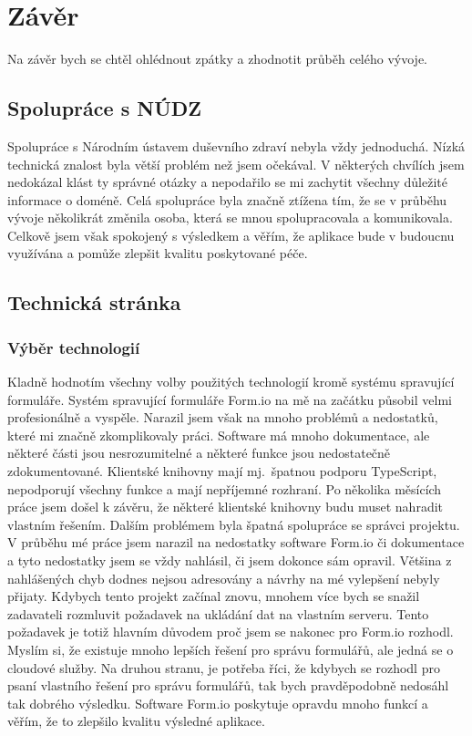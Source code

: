 \chapter*{Závěr}

Na závěr bych se chtěl ohlédnout zpátky a zhodnotit průběh celého vývoje.


\section{Spolupráce s NÚDZ}\label{sec:spoluprace-s-nudz}

Spolupráce s Národním ústavem duševního zdraví nebyla vždy jednoduchá.
Nízká technická znalost byla větší problém než jsem očekával.
V některých chvílích jsem nedokázal klást ty správné otázky a nepodařilo se mi zachytit všechny důležité informace o doméně.
Celá spolupráce byla značně ztížena tím, že se v průběhu vývoje několikrát změnila osoba, která se mnou spolupracovala a komunikovala.
Celkově jsem však spokojený s výsledkem a věřím, že aplikace bude v budoucnu využívána a pomůže zlepšit kvalitu poskytované péče.


\section{Technická stránka}\label{sec:technicka-stranka}

\subsection{Výběr technologií}\label{subsec:vyber-technologii}

Kladně hodnotím všechny volby použitých technologií kromě systému spravující formuláře.
Systém spravující formuláře Form.io na mě na začátku působil velmi profesionálně a vyspěle.
Narazil jsem však na mnoho problémů a nedostatků, které mi značně zkomplikovaly práci.
Software má mnoho dokumentace, ale některé části jsou nesrozumitelné a některé funkce jsou nedostatečně zdokumentované.
Klientské knihovny mají mj.\ špatnou podporu TypeScript, nepodporují všechny funkce a mají nepříjemné rozhraní.
Po několika měsících práce jsem došel k závěru, že některé klientské knihovny budu muset nahradit vlastním řešením.
Dalším problémem byla špatná spolupráce se správci projektu.
V průběhu mé práce jsem narazil na nedostatky software Form.io či dokumentace a tyto nedostatky jsem se vždy nahlásil, či jsem dokonce sám opravil.
Většina z nahlášených chyb dodnes nejsou adresovány a návrhy na mé vylepšení nebyly přijaty.
Kdybych tento projekt začínal znovu, mnohem více bych se snažil zadavateli rozmluvit požadavek na ukládání dat na vlastním serveru.
Tento požadavek je totiž hlavním důvodem proč jsem se nakonec pro Form.io rozhodl.
Myslím si, že existuje mnoho lepších řešení pro správu formulářů, ale jedná se o cloudové služby.
Na druhou stranu, je potřeba říci, že kdybych se rozhodl pro psaní vlastního řešení pro správu formulářů, tak bych pravděpodobně nedosáhl tak dobrého výsledku.
Software Form.io poskytuje opravdu mnoho funkcí a věřím, že to zlepšilo kvalitu výsledné aplikace.

